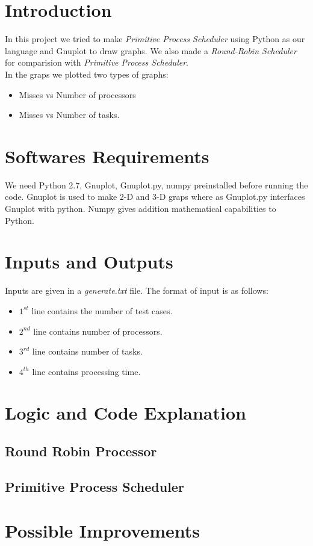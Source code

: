 \documentclass[a4paper,12pt]{article}
\begin{document}
\section*{Introduction}
In this project we tried to make \emph{Primitive Process Scheduler} using Python as our language and Gnuplot to draw graphs. We also made a \emph{Round-Robin Scheduler} for comparision with \emph{Primitive Process Scheduler}.\\ In the graps we plotted two types of graphs:
\begin{itemize}
\item Misses vs Number of processors
\item Misses vs Number of tasks.
\end{itemize}

\section*{Softwares Requirements}
We need Python 2.7, Gnuplot, Gnuplot.py, numpy preinstalled before running the code. Gnuplot is used to make 2-D and 3-D graps where as Gnuplot.py interfaces Gnuplot with python. Numpy gives addition mathematical capabilities to Python.

\section*{Inputs and Outputs}
Inputs are given in a \textit{generate.txt} file. The format of input is as follows:
\begin{itemize}
\item $1^{st}$ line contains the number of test cases.
\item $2^{nd}$ line contains number of processors.
\item $3^{rd}$ line contains number of tasks.
\item $4^{th}$ line contains processing time.


\end{itemize}
\section*{Logic and Code Explanation}
\subsection*{Round Robin Processor}
\subsection*{Primitive Process Scheduler}

\section*{Possible Improvements}
\end{document}
